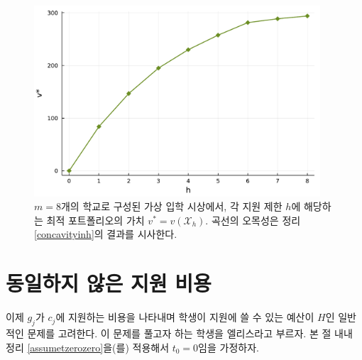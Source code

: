 \documentclass[11pt]{article} %
\newif\ifen
\theoremstyle{definition}
\theoremstyle{definition}
\begin{document}
\begin{figure}[h!] 
 \centering
 \includegraphics[width=0.95\textwidth]{./plots/h_v-example.pdf}
  \caption{  \label{planetsplot}
  \ifen Application limit $h$ versus the optimal portfolio valuation $v^* = v(\mathcal{X}_h)$ in a fictional market with $m=8$ schools. The concave shape suggests the result of Theorem \ref{concavityinh}. 
  \else $m=8$개의 학교로 구성된 가상 입학 시상에서, 각 지원 제한 $h$에 해당하는 최적 포트폴리오의 가치 $v^* = v(\mathcal{X}_h)$. 곡선의 오목성은 정리 \ref{concavityinh}의 결과를 시사한다.\fi}
\end{figure}








\pagebreak
\ifen \section{Heterogeneous application costs} \else\section{동일하지 않은 지원 비용} \fi\label{hetappcosts}
\ifen
Now we turn to the more general problem in which the constant $g_j$ represents the \emph{cost} of applying to $c_j$ and the student, whom we now call Ellis, has a \emph{budget} of $H$ to spend on college applications.  Applying Theorem \ref{assumetzerozero}, we assume $t_0 = 0$ throughout.
\else
이제 $g_j$가 $c_j$에 지원하는 비용을 나타내며 학생이 지원에 쓸 수 있는 예산이 $H$인 일반적인 문제를 고려한다. 이 문제를 풀고자 하는 학생을 엘리스라고 부르자. 본 절 내내 정리 \ref{assumetzerozero}을(를) 적용해서 $t_0 = 0$임을 가정하자.
\fi
\end{document}
